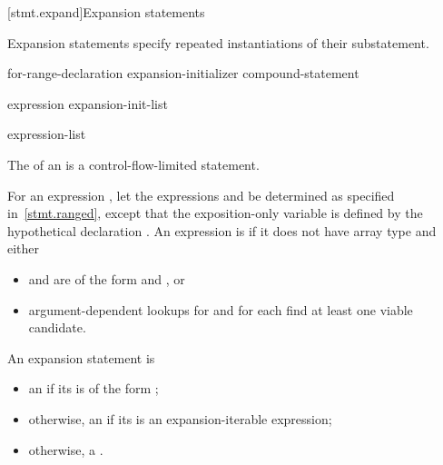 
[stmt.expand]{Expansion statements}

\pnum
Expansion statements specify repeated instantiations
of their substatement.

\begin{bnf}
\br
      \terminal{(}
         for-range-declaration \terminal{:}
        expansion-initializer \terminal{)} compound-statement
\end{bnf}

\begin{bnf}
\br
    expression\br
    expansion-init-list
\end{bnf}

\begin{bnf}
\br
    \terminal{\{} expression-list \opt{\terminal{,}} \terminal{\}}\br
    \terminal{\{} \terminal{\}}
\end{bnf}

\pnum
The  of an 
is a control-flow-limited statement.

\pnum
For an expression , let the expressions
 and  be determined as specified in~\ref{stmt.ranged},
except that the exposition-only variable 
is defined by the hypothetical declaration
.
An expression is  if it does not have array type and either
\begin{itemize}
\item
{} and  are of the form
 and , or
\item
argument-dependent lookups
for  and for 
each find at least one viable candidate.
\end{itemize}

\pnum
An expansion statement is
\begin{itemize}
\item
an  if its 
is of the form ;
\item
otherwise, an  if its 
is an expansion-iterable expression;
\item
otherwise, a .
\end{itemize}

